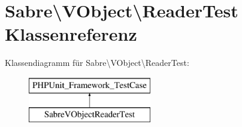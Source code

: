 \hypertarget{class_sabre_1_1_v_object_1_1_reader_test}{}\section{Sabre\textbackslash{}V\+Object\textbackslash{}Reader\+Test Klassenreferenz}
\label{class_sabre_1_1_v_object_1_1_reader_test}
Klassendiagramm für Sabre\textbackslash{}V\+Object\textbackslash{}Reader\+Test\+:\begin{figure}[H]
\begin{center}
\leavevmode
\includegraphics[height=2.000000cm]{class_sabre_1_1_v_object_1_1_reader_test}
\end{center}
\end{figure}
